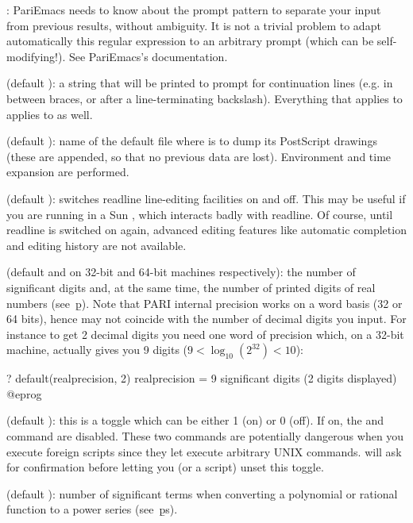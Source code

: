 : PariEmacs needs to know about the prompt pattern to
separate your input from previous  results, without ambiguity. It is
not a trivial problem to adapt automatically this regular expression to an
arbitrary prompt (which can be self-modifying!). See PariEmacs's
documentation.

 (default ): a string that will be printed
to prompt for continuation lines (e.g. in between braces, or after a
line-terminating backslash). Everything that applies to 
applies to  as well.

 (default ): name of the default file where
 is to dump its PostScript drawings (these are appended, so that no
previous data are lost). Environment and time expansion are performed.

 (default ): switches readline line-editing
facilities on and off. This may be useful if you are running  in a Sun
, which interacts badly with readline. Of course, until readline
is switched on again, advanced editing features like automatic completion
and editing history are not available.

 (default  and  on 32-bit and 64-bit machines respectively): the number of significant digits and, at the same
time, the number of printed digits of real numbers (see~\b{p}). Note that
PARI internal precision works on a word basis (32 or 64 bits), hence may not
coincide with the number of decimal digits you input. For instance to get 2
decimal digits you need one word of precision which, on a 32-bit machine,
actually gives you 9 digits ($9 < \log_{10}(2^{32}) < 10$):

\bprog
? default(realprecision, 2)
      realprecision = 9 significant digits (2 digits displayed)
@eprog

 (default ): this is a toggle which can be either 1
(on) or 0 (off). If on, the  and  command are
disabled. These two commands are potentially dangerous when you execute
foreign scripts since they let  execute arbitrary UNIX commands.
 will
ask for confirmation before letting you (or a script) unset this toggle.

 (default ): number of significant terms
when converting a polynomial or rational function to a power series
(see~\b{ps}).

